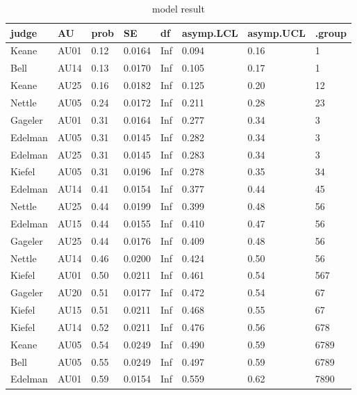 \documentclass{monashthesis}
\begin{document}
\begin{table}[ht]
\begin{center}
\caption{\label{tab:result_1} model result}
\begin{tabular}{llllllll}
\toprule
judge & AU & prob & SE & df & asymp.LCL & asymp.UCL & .group \\
\midrule
Keane & AU01 & 0.12 & 0.0164 & Inf & 0.094 & 0.16 &  1                   \\
Bell & AU14 & 0.13 & 0.0170 & Inf & 0.105 & 0.17 &  1                   \\
Keane & AU25 & 0.16 & 0.0182 & Inf & 0.125 & 0.20 &  12                  \\
Nettle & AU05 & 0.24 & 0.0172 & Inf & 0.211 & 0.28 &   23                 \\
Gageler & AU01 & 0.31 & 0.0164 & Inf & 0.277 & 0.34 &    3                 \\
Edelman & AU05 & 0.31 & 0.0145 & Inf & 0.282 & 0.34 &    3                 \\
Edelman & AU25 & 0.31 & 0.0145 & Inf & 0.283 & 0.34 &    3                 \\
Kiefel & AU05 & 0.31 & 0.0196 & Inf & 0.278 & 0.35 &    34                \\
Edelman & AU14 & 0.41 & 0.0154 & Inf & 0.377 & 0.44 &     45               \\
Nettle & AU25 & 0.44 & 0.0199 & Inf & 0.399 & 0.48 &      56              \\
Edelman & AU15 & 0.44 & 0.0155 & Inf & 0.410 & 0.47 &      56              \\
Gageler & AU25 & 0.44 & 0.0176 & Inf & 0.409 & 0.48 &      56              \\
Nettle & AU14 & 0.46 & 0.0200 & Inf & 0.424 & 0.50 &      56              \\
Kiefel & AU01 & 0.50 & 0.0211 & Inf & 0.461 & 0.54 &      567             \\
Gageler & AU20 & 0.51 & 0.0177 & Inf & 0.472 & 0.54 &       67             \\
Kiefel & AU15 & 0.51 & 0.0211 & Inf & 0.468 & 0.55 &       67             \\
Kiefel & AU14 & 0.52 & 0.0211 & Inf & 0.476 & 0.56 &       678            \\
Keane & AU05 & 0.54 & 0.0249 & Inf & 0.490 & 0.59 &       6789           \\
Bell & AU05 & 0.55 & 0.0249 & Inf & 0.497 & 0.59 &       6789           \\
Edelman & AU01 & 0.59 & 0.0154 & Inf & 0.559 & 0.62 &        7890          \\

\end{tabular}
\end{center}
\end{table}
\end{document}
